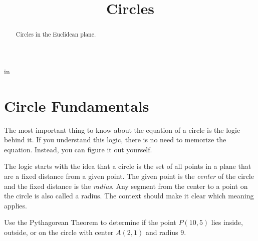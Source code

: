 \documentclass{ximera}
\title{Circles}
\newcommand{\pskip}{\vskip 0.1 in}
\begin{document}
\begin{abstract}
Circles in the Euclidean plane.
\end{abstract}
\maketitle


\pskip

\section{Circle Fundamentals}

The most important thing to know about the equation of a circle is the logic behind it. If you understand this logic, there is no need to memorize the equation. Instead, you can figure it out yourself.

The logic starts with the idea that a circle is the set of all points in a plane that are a fixed distance from a given point. The given point is the \emph{center} of the circle and the fixed distance is the \emph{radius}. Any segment from the center to a point on the circle is also called a radius. The context should make it clear which meaning applies.




\begin{example} \label{Ex1}
Use the Pythagorean Theorem to determine if the point $P(10,5)$ lies inside, outside, or on the circle with center $A(2,1)$ and radius $9$. 
\end{example}
\end{document}
